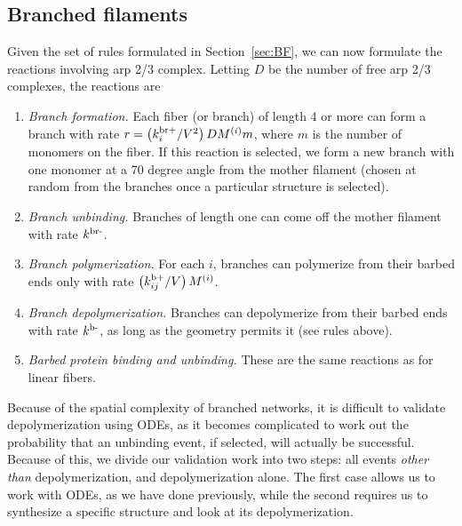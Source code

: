 \documentclass[11pt]{article}
\renewcommand{\i}[1]{{#1}^{(i)}}
\begin{document}
\begin{appendices}
\subsection{Branched filaments}
Given the set of rules formulated in Section\ \ref{sec:BF}, we can now formulate the reactions involving arp 2/3 complex. Letting $D$ be the number of free arp 2/3 complexes, the reactions are
\begin{enumerate}
\item \emph{Branch formation.} Each fiber (or branch) of length 4 or more can form a branch with rate $r=\left(\kbrp_i/V^2\right) D \i M m$, where $m$ is the number of monomers on the fiber. If this reaction is selected, we form a new branch with one monomer at a 70 degree angle from the mother filament (chosen at random from the branches once a particular structure is selected).
\item \emph{Branch unbinding.} Branches of length one can come off the mother filament with rate $k^\text{br-}$.
\item \emph{Branch polymerization.} For each $i$, branches can polymerize from their barbed ends only with rate $\left(\kbp_{ij}/V\right) \i M$. 
\item \emph{Branch depolymerization.} Branches can depolymerize from their barbed ends with rate $k^\text{b-}$, as long as the geometry permits it (see rules above).
\item \emph{Barbed protein binding and unbinding.} These are the same reactions as for linear fibers. 
\end{enumerate}

Because of the spatial complexity of branched networks, it is difficult to validate depolymerization using ODEs, as it becomes complicated to work out the probability that an unbinding event, if selected, will actually be successful. Because of this, we divide our validation work into two steps: all events \emph{other than} depolymerization, and depolymerization alone. The first case allows us to work with ODEs, as we have done previously, while the second requires us to synthesize a specific structure and look at its depolymerization. 


\end{appendices}
\end{document}
